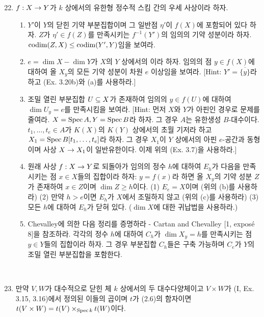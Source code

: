 	\begin{enumerate}[label=\tb{*3.\arabic*.},itemindent=0mm,itemsep=4mm]
	\setcounter{enumi}{21}
	\item {} $f:X\rightarrow Y$가 $k$ 상에서의 유한형 정수적 스킴 간의 우세 사상이라 하자.
	\begin{enumerate}[label=(\alph*)]
	\item $Y'$이 $Y$의 닫힌 기약 부분집합이며 그 일반점 $\eta'$이 $f(X)$에 포함되어 있다 하자.
	$Z$가 $\eta'\in f(Z)$를 만족시키는 $f^{-1}(Y')$의 임의의 기약 성분이라 하자. $\operatorname{codim}(Z,X)\le\operatorname{codim}(Y',Y)$임을 보여라.
	\item $e=\dim X-\dim Y$가 $X$의 $Y$ 상에서의 이라 하자.
	임의의 점 $y\in f(X)$에 대하여 올 $X_y$의 모든 기약 성분이 차원 $e$ 이상임을 보여라.
	[Hint: $Y'=\overline{\{y\}}$라 하고 (Ex. 3.20b)와 (a)를 사용하라.]
	\item 조밀 열린 부분집합 $U\subseteq X$가 존재하여 임의의 $y\in f(U)$에 대하여 $\dim U_y=e$를 만족시킴을 보여라.
	[Hint: 먼저 $X$와 $Y$가 아핀인 경우로 문제를 줄여라. $X=\operatorname{Spec} A,Y=\operatorname{Spec} B$라 하자. 그 경우 $A$는 유한생성 $B$-대수이다.
	$t_1,\ldots,t_e\in A$가 $K(X)$의 $K(Y)$ 상에서의 초월 기저라 하고 $X_1=\operatorname{Spec} B[t_1,\ldots,t_e]$라 하자.
	그 경우 $X_1$이 $Y$ 상에서의 아핀 $e$-공간과 동형이며 사상 $X\rightarrow X_1$이 일반유한이다. 이제 위의 (Ex. 3.7)을 사용하라.]
	\item 원래 사상 $f:X\rightarrow Y$로 되돌아가 임의의 정수 $h$에 대하여 $E_h$가 다음을 만족시키는 점 $x\in X$들의 집합이라 하자:
	$y=f(x)$라 하면 올 $X_y$의 기약 성분 $Z$가 존재하여 $x\in Z$이며 $\dim Z\ge h$이다.
	(1) $E_e=X$이며 (위의 (b)를 사용하라) (2) 만약 $h>e$이면 $E_h$가 $X$에서 조밀하지 않고 (위의 (c)를 사용하라)
	(3) 모든 $h$에 대하여 $E_h$가 닫혀 있다. ($\dim X$에 대한 귀납법을 사용하라.)
	\item Chevalley에 의한 다음 정리를 증명하라 - Cartan and Chevalley [1, expos\'e 8]을 참조하라.
	각각의 정수 $h$에 대하여 $C_h$가 $\dim X_y=h$를 만족시키는 점 $y\in Y$들의 집합이라 하자.
	그 경우 부분집합 $C_h$들은 구축 가능하며 $C_e$가 $Y$의 조밀 열린 부분집합을 포함한다.
	\end{enumerate}
	\sol
	\\
	\end{enumerate}
	\begin{enumerate}[label=\tb{3.\arabic*.},itemindent=0mm,itemsep=4mm]
	\setcounter{enumi}{22}
	\item 만약 $V,W$가 대수적으로 닫힌 체 $k$ 상에서의 두 대수다양체이고 $V\times W$가
	(I, Ex. 3.15, 3.16)에서 정의된 이들의 곱이며 $t$가 (2.6)의 함자이면 $t(V\times W)=t(V)\times_{\operatorname{Spec} k}t(W)$이다.\\
	\sol
	\end{enumerate}
	
